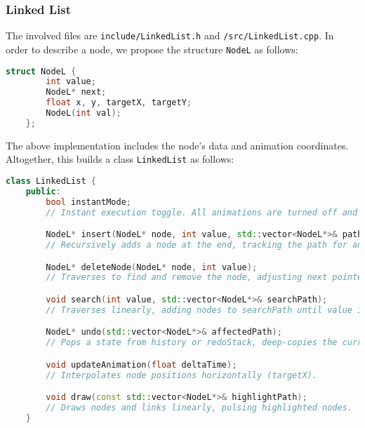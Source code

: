 \documentclass{article}
\begin{document}
\subsubsection{Linked List}
The involved files are \lstinline|include/LinkedList.h| and \lstinline|/src/LinkedList.cpp|. In order to describe a node, we propose the structure \lstinline|NodeL| as follows:
\begin{lstlisting}[language=c++]
	struct NodeL {
		int value;
		NodeL* next;
		float x, y, targetX, targetY;
		NodeL(int val);
	};
\end{lstlisting}
The above implementation includes the node's data and animation coordinates. Altogether, this builds a class \lstinline|LinkedList| as follows:
\begin{lstlisting}[language=c++]
	class LinkedList {
	public:
		bool instantMode;
		// Instant execution toggle. All animations are turned off and nodes are immediately present at their positions.

		NodeL* insert(NodeL* node, int value, std::vector<NodeL*>& path);
		// Recursively adds a node at the end, tracking the path for animation (O(n)).

		NodeL* deleteNode(NodeL* node, int value);
		// Traverses to find and remove the node, adjusting next pointers (O(n)).

		void search(int value, std::vector<NodeL*>& searchPath);
		// Traverses linearly, adding nodes to searchPath until value is found (O(n)).

		NodeL* undo(std::vector<NodeL*>& affectedPath);
		// Pops a state from history or redoStack, deep-copies the current state, and restores the previous/next state.

		void updateAnimation(float deltaTime);
		// Interpolates node positions horizontally (targetX).

		void draw(const std::vector<NodeL*>& highlightPath);
		// Draws nodes and links linearly, pulsing highlighted nodes.
	}
\end{lstlisting}
\end{document}
